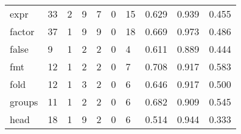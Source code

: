 \begin{longtable}{lp{1.3cm}p{1.3cm}p{1.3cm}p{1.3cm}p{1.3cm}p{1.3cm}p{1.3cm}p{1.3cm}p{1.3cm}}
expr      &                     33 &                                             2 &                                            9 &                                           7 &                                            0 &                                         15 &                                0.629 &                                  0.939 &                                0.455 \\
factor    &                     37 &                                             1 &                                            9 &                                           9 &                                            0 &                                         18 &                                0.669 &                                  0.973 &                                0.486 \\
false     &                      9 &                                             1 &                                            2 &                                           2 &                                            0 &                                          4 &                                0.611 &                                  0.889 &                                0.444 \\
fmt       &                     12 &                                             1 &                                            2 &                                           2 &                                            0 &                                          7 &                                0.708 &                                  0.917 &                                0.583 \\
fold      &                     12 &                                             1 &                                            3 &                                           2 &                                            0 &                                          6 &                                0.646 &                                  0.917 &                                0.500 \\
groups    &                     11 &                                             1 &                                            2 &                                           2 &                                            0 &                                          6 &                                0.682 &                                  0.909 &                                0.545 \\
head      &                     18 &                                             1 &                                            9 &                                           2 &                                            0 &                                          6 &                                0.514 &                                  0.944 &                                0.333 \\

\end{longtable}
